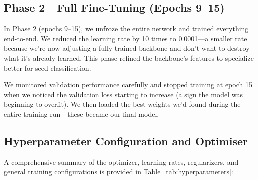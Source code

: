 \subsection{Phase 2---Full Fine-Tuning (Epochs 9--15)}

In Phase 2 (epochs 9–15), we unfroze the entire network and trained everything end-to-end. We reduced the learning rate by 10 times to 0.0001—a smaller rate because we're now adjusting a fully-trained backbone and don't want to destroy what it's already learned. This phase refined the backbone's features to specialize better for seed classification.

We monitored validation performance carefully and stopped training at epoch 15 when we noticed the validation loss starting to increase (a sign the model was beginning to overfit). We then loaded the best weights we'd found during the entire training run—these became our final model.

\subsection{Hyperparameter Configuration and Optimiser}

A comprehensive summary of the optimizer, learning rates, regularizers, and general training configurations is provided in Table~\ref{tab:hyperparameters}:

\begin{table}[htbp]
\centering
\caption{Hyperparameter Configuration and Training Settings}
\label{tab:hyperparameters}
\end{table}

